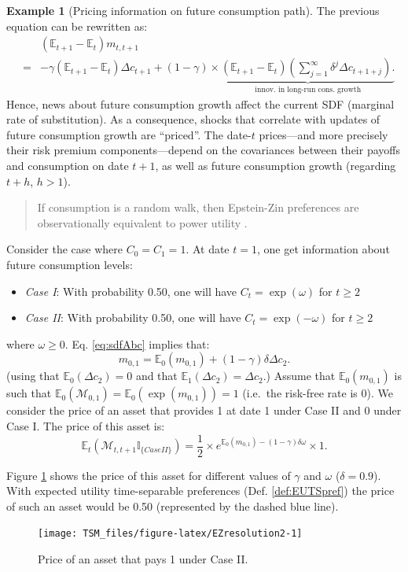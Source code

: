 \documentclass[
  12pt,
]{book}
\providecommand{\tightlist}{%
  \setlength{\itemsep}{0pt}\setlength{\parskip}{0pt}}
\theoremstyle{definition}
\theoremstyle{definition}
\newtheorem{example}{Example}[chapter]
\theoremstyle{definition}
\theoremstyle{definition}
\theoremstyle{remark}
\begin{document}
\begin{example}[Pricing information on future consumption path]
The previous equation can be rewritten as:
\begin{eqnarray}
&& (\mathbb{E}_{t+1} - \mathbb{E}_t) m_{t,t+1} \nonumber \\
&=& - \gamma(\mathbb{E}_{t+1} - \mathbb{E}_t)\Delta c_{t+1} +    (1 - \gamma) \times \underbrace{ (\mathbb{E}_{t+1} - \mathbb{E}_t) \left(  \sum_{j=1}^{\infty}  \delta^j \Delta c_{t+1+j}  \right).}_{\mbox{innov. in long-run cons. growth}}\label{eq:sdfAbc}
\end{eqnarray}
Hence, news about future consumption growth affect the current SDF (marginal rate of substitution). As a consequence, shocks that correlate with updates of future consumption growth are ``priced''. The date-\(t\) prices---and more precisely their risk premium components---depend on the covariances between their payoffs and consumption on date \(t+1\), as well as future consumption growth (regarding \(t+h\), \(h>1\)).

\begin{quote}
If consumption is a random walk, then Epstein-Zin preferences are observationally equivalent to power utility \citep{Kocherlakota_1990}.
\end{quote}

Consider the case where \(C_0 = C_1 = 1\).
At date \(t=1\), one get information about future consumption levels:

\begin{itemize}
\tightlist
\item
  \emph{Case I}: With probability 0.50, one will have \(C_t=\exp(\omega)\) for \(t\ge2\)
\item
  \emph{Case II}: With probability 0.50, one will have \(C_t=\exp(-\omega)\) for \(t\ge2\)
\end{itemize}

where \(\omega \ge 0\).
Eq. \eqref{eq:sdfAbc} implies that:
\[
m_{0,1} = \mathbb{E}_0(m_{0,1}) + (1 - \gamma)\delta \Delta c_{2}.
\]
(using that \(\mathbb{E}_0(\Delta c_{2})=0\) and that \(\mathbb{E}_1(\Delta c_{2})=\Delta c_{2}\).)
Assume that \(\mathbb{E}_0(m_{0,1})\) is such that \(\mathbb{E}_0(\mathcal{M}_{0,1})=\mathbb{E}_0(\exp(m_{0,1}))=1\) (i.e.~the risk-free rate is 0).
We consider the price of an asset that provides 1 at date 1 under Case II and 0 under Case I.
The price of this asset is:
\[
\mathbb{E}_t(\mathcal{M}_{t,t+1}\mathbb{I}_{\{Case II\}}) = \frac{1}{2} \times e^{\mathbb{E}_0(m_{0,1}) - (1 - \gamma)\delta \omega} \times 1.
\]

Figure \ref{fig:EZresolution2} shows the price of this asset for different values of \(\gamma\) and \(\omega\) (\(\delta=0.9\)). With expected utility time-separable preferences (Def. \ref{def:EUTSpref}) the price of such an asset would be 0.50 (represented by the dashed blue line).

\begin{figure}
\texttt{[image: TSM\_files/figure-latex/EZresolution2-1]} \caption{Price of an asset that pays 1 under Case II.}\label{fig:EZresolution2}
\end{figure}

\end{example}
\end{document}
